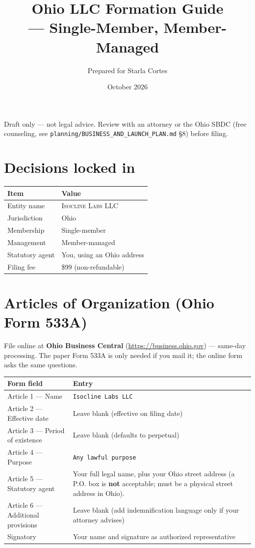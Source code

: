 \documentclass[11pt,a4paper]{article}
\title{\textbf{Ohio LLC Formation Guide}\\[0.3em]
\large \name{Isocline Labs LLC} --- Single-Member, Member-Managed}
\author{Prepared for Starla Cortes}
\date{October 2026}
\newcommand{\code}[1]{\texttt{\small #1}}
\newcommand{\name}[1]{\textsc{#1}}
\begin{document}
\maketitle

\noindent
Draft only --- not legal advice. Review with an attorney or the Ohio SBDC
(free counseling, see \code{planning/BUSINESS\_AND\_LAUNCH\_PLAN.md} \S8) before filing.

\section{Decisions locked in}

\begin{center}
\begin{tabular}{@{}ll@{}}
\toprule
\textbf{Item} & \textbf{Value} \\
\midrule
Entity name & \name{Isocline Labs LLC} \\
Jurisdiction & Ohio \\
Membership & Single-member \\
Management & Member-managed \\
Statutory agent & You, using an Ohio address \\
Filing fee & \$99 (non-refundable) \\
\bottomrule
\end{tabular}
\end{center}

\section{Articles of Organization (Ohio Form 533A)}

File online at \textbf{Ohio Business Central} (\url{https://business.ohio.gov})
--- same-day processing. The paper Form 533A is only needed if you mail it; the
online form asks the same questions.

\begin{center}
\begin{tabular}{@{}L{5.0cm}L{11.0cm}@{}}
\toprule
\textbf{Form field} & \textbf{Entry} \\
\midrule
Article 1 --- Name & \code{Isocline Labs LLC} \\
Article 2 --- Effective date & Leave blank (effective on filing date) \\
Article 3 --- Period of existence & Leave blank (defaults to perpetual) \\
Article 4 --- Purpose & \code{Any lawful purpose} \\
Article 5 --- Statutory agent & Your full legal name, plus your Ohio street
address (a P.O. box is \textbf{not} acceptable; must be a physical street
address in Ohio). \\
Article 6 --- Additional provisions & Leave blank (add indemnification language
only if your attorney advises) \\
Signatory & Your name and signature as authorized representative \\
\bottomrule
\end{tabular}
\end{center}
\end{document}
